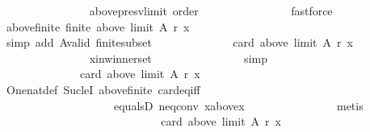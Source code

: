 \begin{isabellebody}
\ \ \ \ \ \ \ \ \ \ \ \ \ \ \isamarkupfalse%
\ above{\isacharunderscore}{\kern0pt}presv{\isacharunderscore}{\kern0pt}limit\ order\isanewline
\ \ \ \ \ \ \ \ \ \ \ \ \ \ \isamarkupfalse%
\ fastforce\isanewline
\ \ \ \ \ \ \ \ \ \ \ \ \isamarkupfalse%
\ above{\isacharunderscore}{\kern0pt}finite{\isacharcolon}{\kern0pt}\ {\isachardoublequoteopen}finite\ {\isacharparenleft}{\kern0pt}above\ {\isacharparenleft}{\kern0pt}limit\ A\ r{\isacharparenright}{\kern0pt}\ x{\isacharparenright}{\kern0pt}{\isachardoublequoteclose}\isanewline
\ \ \ \ \ \ \ \ \ \ \ \ \ \ \isamarkupfalse%
\ {\isacharparenleft}{\kern0pt}simp\ add{\isacharcolon}{\kern0pt}\ A{\isacharunderscore}{\kern0pt}valid\ finite{\isacharunderscore}{\kern0pt}subset{\isacharparenright}{\kern0pt}\isanewline
\ \ \ \ \ \ \ \ \ \ \ \ \isamarkupfalse%
\ {\isachardoublequoteopen}card\ {\isacharparenleft}{\kern0pt}above\ {\isacharparenleft}{\kern0pt}limit\ A\ r{\isacharparenright}{\kern0pt}\ x{\isacharparenright}{\kern0pt}\ {\isasymle}\ {}{\isachardoublequoteclose}\isanewline
\ \ \ \ \ \ \ \ \ \ \ \ \ \ \isamarkupfalse%
\ x{\isacharunderscore}{\kern0pt}in{\isacharunderscore}{\kern0pt}winner{\isacharunderscore}{\kern0pt}set\isanewline
\ \ \ \ \ \ \ \ \ \ \ \ \ \ \isamarkupfalse%
\ simp\isanewline
\ \ \ \ \ \ \ \ \ \ \ \ \isamarkupfalse%
\ \isamarkupfalse%
\isanewline
\ \ \ \ \ \ \ \ \ \ \ \ \ \ {\isachardoublequoteopen}card\ {\isacharparenleft}{\kern0pt}above\ {\isacharparenleft}{\kern0pt}limit\ A\ r{\isacharparenright}{\kern0pt}\ x{\isacharparenright}{\kern0pt}\ {\isasymge}\ {}{\isachardoublequoteclose}\isanewline
\ \ \ \ \ \ \ \ \ \ \ \ \ \ \isamarkupfalse%
\ One{\isacharunderscore}{\kern0pt}nat{\isacharunderscore}{\kern0pt}def\ Suc{\isacharunderscore}{\kern0pt}leI\ above{\isacharunderscore}{\kern0pt}finite\ card{\isacharunderscore}{\kern0pt}eq{\isacharunderscore}{\kern0pt}{}{\isacharunderscore}{\kern0pt}iff\isanewline
\ \ \ \ \ \ \ \ \ \ \ \ \ \ \ \ \ \ \ \ equals{}D\ neq{}{\isacharunderscore}{\kern0pt}conv\ x{\isacharunderscore}{\kern0pt}above{\isacharunderscore}{\kern0pt}x\isanewline
\ \ \ \ \ \ \ \ \ \ \ \ \ \ \isamarkupfalse%
\ metis\isanewline
\ \ \ \ \ \ \ \ \ \ \ \ \isamarkupfalse%
\ \isamarkupfalse%
\isanewline
\ \ \ \ \ \ \ \ \ \ \ \ \ \ {\isachardoublequoteopen}card\ {\isacharparenleft}{\kern0pt}above\ {\isacharparenleft}{\kern0pt}limit\ A\ r{\isacharparenright}{\kern0pt}\ x{\isacharparenright}{\kern0pt}\ {\isacharequal}{\kern0pt}\ {}{\isachardoublequoteclose}\isanewline

\end{isabellebody}
